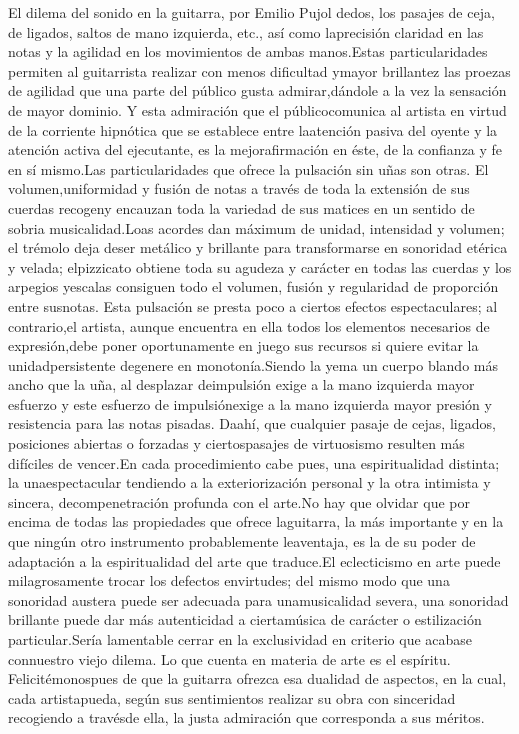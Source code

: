 \documentclass[
11pt, %
a4paper, %
oneside, %
headinclude,footinclude, %
BCOR5mm, %
]{scrartcl}
\begin{document}
{El dilema del sonido en la guitarra, por Emilio Pujol
dedos, los pasajes de ceja, de ligados, saltos de mano izquierda, etc., así como laprecisión claridad en las notas y la agilidad en los movimientos de ambas manos.Estas particularidades permiten al guitarrista realizar con menos dificultad ymayor brillantez las proezas de agilidad que una parte del público gusta admirar,dándole a la vez la sensación de mayor dominio. Y esta admiración que el públicocomunica al artista en virtud de la corriente hipnótica que se establece entre laatención pasiva del oyente y la atención activa del ejecutante, es la mejorafirmación en éste, de la confianza y fe en sí mismo.Las particularidades que ofrece la pulsación sin uñas son otras. El volumen,uniformidad y fusión de notas a través de toda la extensión de sus cuerdas recogeny encauzan toda la variedad de sus matices en un sentido de sobria musicalidad.Loas acordes dan máximum de unidad, intensidad y volumen; el trémolo deja deser metálico y brillante para transformarse en sonoridad etérica y velada; elpizzicato obtiene toda su agudeza y carácter en todas las cuerdas y los arpegios yescalas consiguen todo el volumen, fusión y regularidad de proporción entre susnotas. Esta pulsación se presta poco a ciertos efectos espectaculares; al contrario,el artista, aunque encuentra en ella todos los elementos necesarios de expresión,debe poner oportunamente en juego sus recursos si quiere evitar la unidadpersistente degenere en monotonía.Siendo la yema un cuerpo blando más ancho que la uña, al desplazar deimpulsión exige a la mano izquierda mayor esfuerzo y este esfuerzo de impulsiónexige a la mano izquierda mayor presión y resistencia para las notas pisadas. Daahí, que cualquier pasaje de cejas, ligados, posiciones abiertas o forzadas y ciertospasajes de virtuosismo resulten más difíciles de vencer.En cada procedimiento cabe pues, una espiritualidad distinta; la unaespectacular tendiendo a la exteriorización personal y la otra intimista y sincera, decompenetración profunda con el arte.No hay que olvidar que por encima de todas las propiedades que ofrece laguitarra, la más importante y en la que ningún otro instrumento probablemente leaventaja, es la de su poder de adaptación a la espiritualidad del arte que traduce.El eclecticismo en arte puede milagrosamente trocar los defectos envirtudes; del mismo modo que una sonoridad austera puede ser adecuada para unamusicalidad severa, una sonoridad brillante puede dar más autenticidad a ciertamúsica de carácter o estilización particular.Sería lamentable cerrar en la exclusividad en criterio que acabase connuestro viejo dilema. Lo que cuenta en materia de arte es el espíritu. Felicitémonospues de que la guitarra ofrezca esa dualidad de aspectos, en la cual, cada artistapueda, según sus sentimientos realizar su obra con sinceridad recogiendo a travésde ella, la justa admiración que corresponda a sus méritos.}
\end{document}
